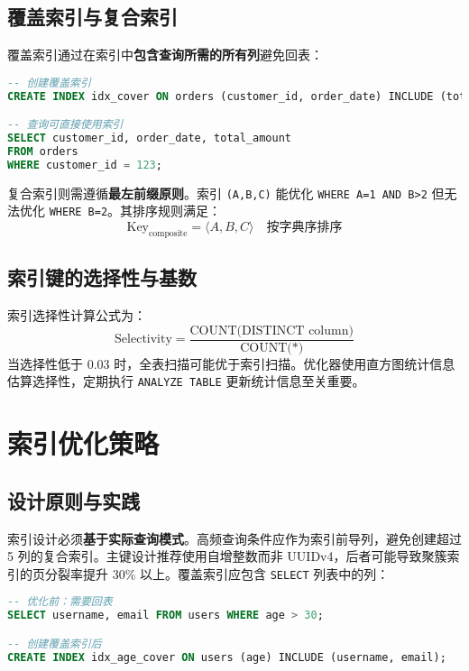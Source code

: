 \section{覆盖索引与复合索引}
覆盖索引通过在索引中\textbf{包含查询所需的所有列}避免回表：\par
\begin{lstlisting}[language=sql]
-- 创建覆盖索引
CREATE INDEX idx_cover ON orders (customer_id, order_date) INCLUDE (total_amount);

-- 查询可直接使用索引
SELECT customer_id, order_date, total_amount 
FROM orders 
WHERE customer_id = 123;
\end{lstlisting}
复合索引则需遵循\textbf{最左前缀原则}。索引 \texttt{(A,B,C)} 能优化 \texttt{WHERE A=1 AND B>2} 但无法优化 \texttt{WHERE B=2}。其排序规则满足：
$$ \text{Key}_{\text{composite}} = \langle A, B, C \rangle \quad \text{按字典序排序} $$\par
\section{索引键的选择性与基数}
索引选择性计算公式为：
$$ \text{Selectivity} = \frac{\text{COUNT(DISTINCT column)}}{\text{COUNT(*)}} $$
当选择性低于 0.03 时，全表扫描可能优于索引扫描。优化器使用直方图统计信息估算选择性，定期执行 \texttt{ANALYZE TABLE} 更新统计信息至关重要。\par
\chapter{索引优化策略}
\section{设计原则与实践}
索引设计必须\textbf{基于实际查询模式}。高频查询条件应作为索引前导列，避免创建超过 5 列的复合索引。主键设计推荐使用自增整数而非 UUIDv4，后者可能导致聚簇索引的页分裂率提升 30\%{} 以上。覆盖索引应包含 \texttt{SELECT} 列表中的列：\par
\begin{lstlisting}[language=sql]
-- 优化前：需要回表
SELECT username, email FROM users WHERE age > 30;

-- 创建覆盖索引后
CREATE INDEX idx_age_cover ON users (age) INCLUDE (username, email);
\end{lstlisting}
